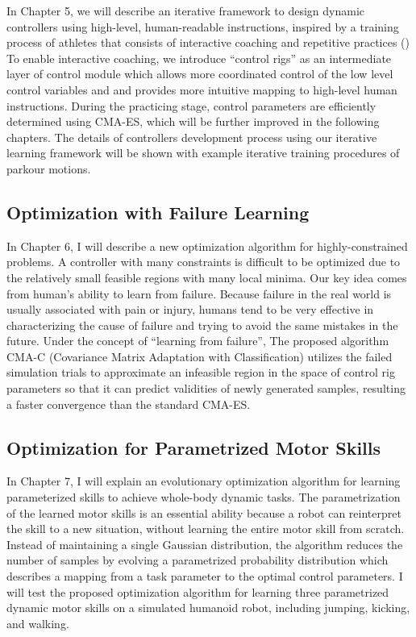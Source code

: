 In Chapter 5, we will describe an iterative framework to design dynamic
controllers using high-level, human-readable instructions,
inspired by a training process of athletes that consists of
interactive coaching and repetitive practices ()
To enable interactive coaching, we introduce ``control rigs'' as
an intermediate layer of control module which allows more coordinated control
of the low level control variables and and provides more intuitive mapping to
high-level human instructions. 
During the practicing stage, control parameters are efficiently determined
using CMA-ES, which will be further improved in the following chapters.
The details of controllers development process using our iterative learning
framework will be shown with example iterative training procedures of parkour
motions.

\subsection{Optimization with Failure Learning}
In Chapter 6, I will describe a new optimization algorithm for
highly-constrained problems.
A controller with many constraints is difficult to be optimized due to the
relatively small feasible regions with many local minima.
Our key idea comes from human’s ability to learn from failure. 
Because failure in the real world is usually associated with pain or injury,
humans tend to be very effective in characterizing the cause of failure and
trying to avoid the same mistakes in the future. 
Under the concept of ``learning from failure'', The proposed algorithm CMA-C
(Covariance Matrix Adaptation with Classification) utilizes the failed
simulation trials to approximate an infeasible region in the space of control
rig parameters so that it can predict validities of newly generated samples,
resulting a faster convergence than the standard CMA-ES.

\subsection{Optimization for Parametrized Motor Skills}
In Chapter 7, I will explain an evolutionary optimization algorithm for
learning parameterized skills to achieve whole-body dynamic tasks.
The parametrization of the learned motor skills is an essential ability
because a robot can reinterpret the skill to a new situation, without
learning the entire motor skill from scratch.
Instead of maintaining a single Gaussian distribution, 
the algorithm reduces the number of samples by evolving a parametrized
probability distribution which describes a mapping from a task parameter
to the optimal control parameters.
I will test the proposed optimization algorithm for learning three parametrized
dynamic motor skills on a simulated humanoid robot, including jumping,
kicking, and walking. 

